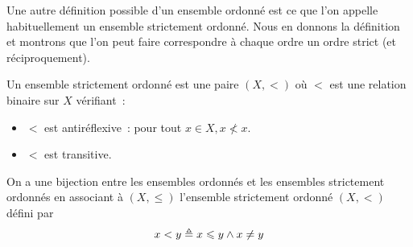 Une autre définition possible d'un ensemble ordonné est ce que l'on appelle
habituellement un ensemble strictement ordonné. Nous en donnons la définition et
montrons que l'on peut faire correspondre à chaque ordre un ordre strict (et
réciproquement).

\begin{definition}
  Un ensemble strictement ordonné est une paire $(X,<)$ où $<$ est une relation
  binaire sur $X$ vérifiant~:
  \begin{itemize}
  \item $<$ est antiréflexive~: pour tout $x\in X, x\not< x$.
  \item $<$ est transitive.
  \end{itemize}
\end{definition}

\begin{proposition}
  On a une bijection entre les ensembles ordonnés et les ensembles strictement
  ordonnés en associant à $(X,\leq)$ l'ensemble strictement ordonné $(X,<)$
  défini par
  \[x < y \triangleq x \leqslant y \land x \neq y\]
\end{proposition}

